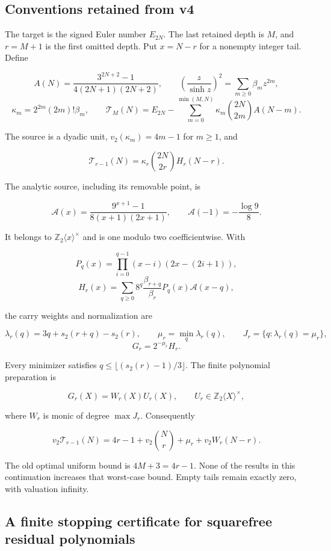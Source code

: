 \documentclass[11pt,letterpaper]{article}
\begin{document}
\subsection{Conventions retained from v4}\label{conventions-retained-from-v4}

The target is the signed Euler number \(E_{2N}\). The last retained depth is \(M\), and \(r=M+1\) is the first omitted depth. Put \(x=N-r\) for a nonempty integer tail. Define

\[
A(N)=\frac{3^{2N+2}-1}{4(2N+1)(2N+2)},\qquad
\left(\frac z{\sinh z}\right)^2=\sum_{m\ge0}\beta_mz^{2m},
\] \[
\kappa_m=2^{2m}(2m)!\beta_m,
\qquad
\mathcal T_M(N)=E_{2N}-\sum_{m=0}^{\min(M,N)}
\kappa_m\binom{2N}{2m}A(N-m).
\]

The source is a dyadic unit, \(v_2(\kappa_m)=4m-1\) for \(m\ge1\), and

\[
\mathcal T_{r-1}(N)=\kappa_r\binom{2N}{2r}H_r(N-r).
\]

The analytic source, including its removable point, is

\[
\mathscr A(x)=\frac{9^{x+1}-1}{8(x+1)(2x+1)},
\qquad \mathscr A(-1)=-\frac{\log9}{8}.
\]

It belongs to \(\mathbb Z_2\langle x\rangle^\times\) and is one modulo two coefficientwise. With

\[
P_q(x)=\prod_{i=0}^{q-1}(x-i)(2x-(2i+1)),
\] \[
H_r(x)=\sum_{q\ge0}8^q\frac{\beta_{r+q}}{\beta_r}
P_q(x)\mathscr A(x-q),
\]

the carry weights and normalization are

\[
\lambda_r(q)=3q+s_2(r+q)-s_2(r),\qquad
\mu_r=\min_q\lambda_r(q),\qquad
J_r=\{q:\lambda_r(q)=\mu_r\},
\] \[
G_r=2^{-\mu_r}H_r.
\]

Every minimizer satisfies \(q\le\lfloor(s_2(r)-1)/3\rfloor\). The finite polynomial preparation is

\[
G_r(X)=W_r(X)U_r(X),\qquad
U_r\in\mathbb Z_2\langle X\rangle^\times,
\]

where \(W_r\) is monic of degree \(\max J_r\). Consequently

\[
\boxed{
 v_2\mathcal T_{r-1}(N)
 =4r-1+v_2\binom Nr+\mu_r+v_2W_r(N-r).
} \tag{V.1}
\]

The old optimal uniform bound is \(4M+3=4r-1\). None of the results in this continuation increases that worst-case bound. Empty tails remain exactly zero, with valuation infinity.

\subsection{A finite stopping certificate for squarefree residual polynomials}\label{a-finite-stopping-certificate-for-squarefree-residual-polynomials}
\end{document}
